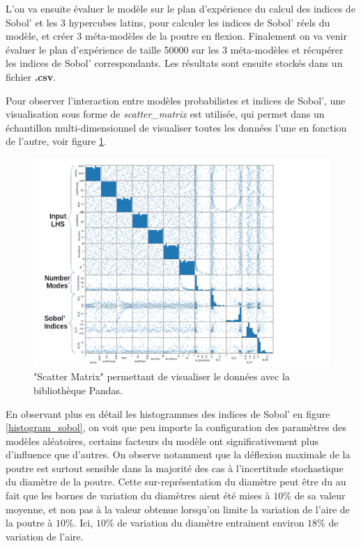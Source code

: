 \documentclass[a4paper,10pt]{article}
\begin{document}
L'on va ensuite évaluer le modèle sur le plan d’expérience du calcul des indices de Sobol' et les 3 hypercubes latins, pour calculer les indices de Sobol' réels du modèle, et créer 3 méta-modèles de la poutre en flexion. Finalement on va venir évaluer le plan d’expérience de taille 50000 sur les 3 méta-modèles et récupérer les indices de Sobol' correspondants. Les résultats sont ensuite stockés dans un fichier \textbf{.csv}. \par \bigskip 

Pour observer l'interaction entre modèles probabilistes et indices de Sobol', une visualisation sous forme de \textit{scatter\_matrix} est utilisée, qui permet dans un échantillon multi-dimensionnel de visualiser toutes les données l'une en fonction de l'autre, voir figure \ref{scatter_matrix}. 


\begin{figure}[H]
   \centering
   \hspace*{-1in}
   \noindent \includegraphics[scale = 0.46]{scatter_matrix.png}
      \caption{"Scatter Matrix" permettant de visualiser le données avec la bibliothèque Pandas.}
         \label{scatter_matrix}
\end{figure}

En observant plus en détail les histogrammes des indices de Sobol' en figure \ref{histogram_sobol}, on voit que peu importe la configuration des paramètres des modèles aléatoires, certains facteurs du modèle ont significativement plus d'influence que d'autres. On observe notamment que la déflexion maximale de la poutre est surtout sensible dans la majorité des cas à l'incertitude stochastique du diamètre de la poutre.  Cette sur-représentation du diamètre peut être du au fait que les bornes de variation du diamètres aient été mises à $10\%$  de sa valeur moyenne, et non pas à la valeur obtenue lorsqu'on limite la variation de l'aire de la poutre à $10\%$.	Ici, $10\%$ de variation du diamètre entrainent environ $18\%$ de variation de l'aire.
\end{document}
